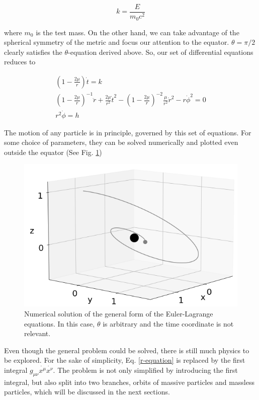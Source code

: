 \documentclass[letterpaper,11pt,onecolumn]{article}
\begin{document}
\begin{equation}
    k = \frac{E}{m_0 c^2}
\end{equation}

where $m_0$ is the test mass. On the other hand, we can take advantage of the spherical symmetry of the metric and focus our attention to the equator. $\theta = \pi / 2$ clearly satisfies the $\theta$-equation derived above. So, our set of differential equations reduces to 

    \begin{eqnarray}
        \left( 1 - \frac{2 \mu}{r} \right) \dot{t} = k \label{t-equation} \\
        \left( 1 - \frac{2 \mu}{r} \right)^{-1} \ddot{r} + \frac{2\mu}{r^2} \dot{t}^2 - \left( 1 - \frac{2 \mu}{r} \right)^{-2} \frac{\mu}{r^2} \dot{r}^2 - r\dot{\phi}^2  = 0 \label{r-equation} \\
        r^2 \dot{\phi} = h \label{phi-equation}
    \end{eqnarray}

The motion of any particle is in principle, governed by this set of equations. For some choice of parameters, they can be solved numerically and plotted even outside the equator (See Fig. \ref{fig:general_orbit})

\begin{figure}[h!]
    \centering
    \includegraphics[width=0.6\linewidth]{Presentations/Images/2_gen_obit1.png}
    \caption{Numerical solution of the general form of the Euler-Lagrange equations. In this case, $\theta$ is arbitrary and the time coordinate is not relevant.}
    \label{fig:general_orbit}
\end{figure}

Even though the general problem could be solved, there is still much physics to be explored. For the sake of simplicity, Eq. \ref{r-equation} is replaced by the first integral $g_{\mu \nu} \dot{x^\mu} \dot{x^\nu}$. The problem is not only simplified by introducing the first integral, but also split into two branches, orbits of massive particles and massless particles, which will be discussed in the next sections.
\end{document}

